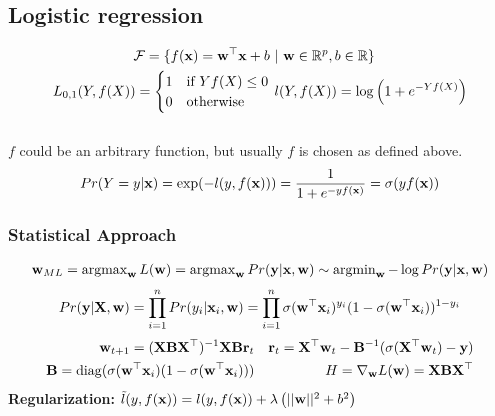 %
\begin{mdframed}[style=eqbox]
\subsection{Logistic regression}
\vspace*{-6pt}\begin{align*}
  \mathcal{F} = \{f(\mathbf{x}) = \mathbf{w}^\top \mathbf{x} + b &~\vert~ \mathbf{w} \in \mathbb R^p, b \in \mathbb R\}\\
  L_{0,1}(Y, f(X)) = \begin{cases}
    1 & \text{if } Y f(X) \leq 0\\
    0 & \text{otherwise}
  \end{cases}&~
  l(Y, f(X)) = \log \left(1 + e^{-Y f(X)}\right)
\end{align*}\vspace*{-12pt}\\
\small{$f$ could be an arbitrary function, but usually $f$ is chosen as defined above.}
\begin{align*}
  Pr(Y = y \vert \mathbf{x}) = \exp( - l(y, f(\mathbf{x}))) = \frac{1}{1 + e^{-y f(\mathbf{x})}} = \sigma(y f(\mathbf{x}))
\end{align*}
\subsubsection{Statistical Approach}
\begin{align*}
  \mathbf{w}_{ML} = \operatorname{argmax}_{\mathbf{w}} L(\mathbf{w}) = \operatorname{argmax}_{\mathbf{w}} Pr(\mathbf{y} \vert \mathbf{x}, \mathbf{w}) \sim \operatorname{argmin}_{\mathbf{w}} - \log Pr(\mathbf{y} \vert \mathbf{x}, \mathbf{w})
\end{align*}
\vspace*{-16pt}\begin{align*}
   Pr(\mathbf{y} \vert \mathbf{X}, \mathbf{w}) = \prod_{i = 1}^n Pr(y_i \vert \mathbf{x}_i, \mathbf{w}) = \prod_{i = 1}^n \sigma(\mathbf{w}^\top \mathbf{x}_i)^{y_i} (1 - \sigma(\mathbf{w}^\top \mathbf{x}_i))^{1 - y_i}
\end{align*}
\vspace*{-8pt}\begin{align*}
\mathbf{w}_{t + 1} = (\mathbf{X} \mathbf{B} \mathbf{X}^\top)^{ - 1} \mathbf{X} \mathbf{B} \mathbf{r}_t && \mathbf{r}_t = \mathbf{X}^\top \mathbf{w}_t - \mathbf{B}^{-1} (\sigma(\mathbf{X}^\top \mathbf{w}_t) - \mathbf{y})\\
\mathbf{B} = \operatorname*{diag}(\sigma(\mathbf{w}^\top \mathbf{x}_i)(1 - \sigma(\mathbf{w}^\top \mathbf{x}_i))) && H = \nabla_{\mathbf{w}} L(\mathbf{w}) = \mathbf{X} \mathbf{B} \mathbf{X}^\top
\end{align*}
\textbf{Regularization:} $\tilde{l}(y, f(\mathbf{x})) = l(y, f(\mathbf{x})) + \lambda \left(\vert\vert \mathbf{w} \vert\vert^2 + b^2\right)$
\end{mdframed}
